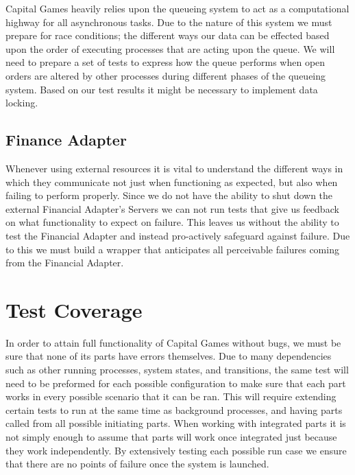 Capital Games heavily relies upon the queueing system to act as a 
computational highway for all asynchronous tasks.  Due to the 
nature of this system we must prepare for race conditions; the 
different ways our data can be effected based upon the order of 
executing processes that are acting upon the queue. We will need 
to prepare a set of tests to express how the queue performs when 
open orders are altered by other processes during different phases 
of the queueing system. Based on our test results it might be 
necessary to implement data locking.

\subsection{Finance Adapter}

Whenever using external resources it is vital to understand the 
different ways in which they communicate not just when functioning 
as expected, but also when failing to perform properly.  Since we 
do not have the ability to shut down the external Financial 
Adapter's Servers we can not run tests that give us feedback on 
what functionality to expect on failure.  This leaves us without 
the ability to test the Financial Adapter and instead pro-actively 
safeguard against failure. Due to this we must build a wrapper that 
anticipates all perceivable failures coming from the Financial Adapter.

\section{Test Coverage}

In order to attain full functionality of Capital Games without bugs, 
we must be sure that none of its parts have errors themselves.  Due 
to many dependencies such as other running processes, system states, 
and transitions, the same test will need to be preformed for each 
possible configuration to make sure that each part works in every 
possible scenario that it can be ran. This will require extending 
certain tests to run at the same time as background processes, and 
having parts called from all possible initiating parts. When working 
with integrated parts it is not simply enough to assume that parts 
will work once integrated just because they work independently. By 
extensively testing each possible run case we ensure that there are 
no points of failure once the system is launched.

